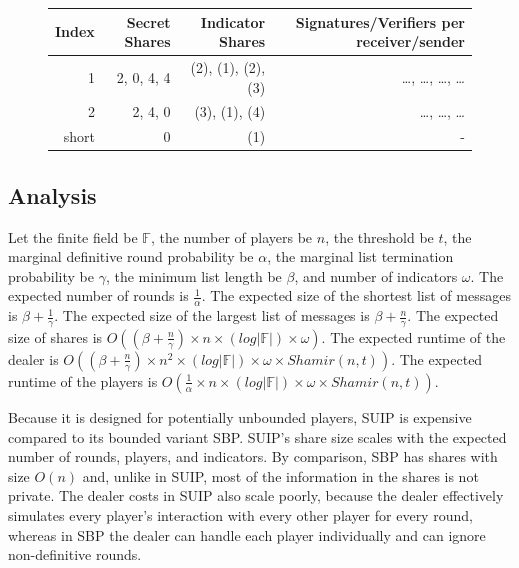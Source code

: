 \documentclass{dalcsthesis}
\begin{document}
\begin{figure}
\begin{itemize}
      \begin{tabular}{|r|r|r|r|}
      \hline
        Index & Secret Shares & Indicator Shares & Signatures/Verifiers per receiver/sender \\
      \hline
        1 & 2, 0, 4, 4 & (2), (1), (2), (3) & \ldots, \ldots, \ldots, \ldots\\
      \hline
        2 & 2, 4, 0 & (3), (1), (4) & \ldots, \ldots, \ldots\\
      \hline
        short & 0 & (1) & -\\
      \hline
      \end{tabular}
  \end{itemize}
\end{figure}

\subsection{Analysis}

Let the finite field be $\mathbb{F}$, the number of players be $n$, the threshold be $t$, the marginal definitive round probability be $\alpha$, the marginal list termination probability be $\gamma$, the minimum list length be $\beta$, and number of indicators $\omega$. The expected number of rounds is $\frac{1}{\alpha}$. The expected size of the shortest list of messages is $\beta + \frac{1}{\gamma}$. The expected size of the largest list of messages is $\beta + \frac{n}{\gamma}$. The expected size of shares is $O((\beta + \frac{n}{\gamma}) \times n \times (log |\mathbb{F}|) \times \omega)$. The expected runtime of the dealer is $O((\beta + \frac{n}{\gamma}) \times n^2 \times (log |\mathbb{F}|) \times \omega \times Shamir(n, t))$. The expected runtime of the players is $O(\frac{1}{\alpha} \times n \times (log |\mathbb{F}|) \times \omega \times Shamir(n, t))$.

Because it is designed for potentially unbounded players, SUIP is expensive compared to its bounded variant SBP. SUIP's share size scales with the expected number of rounds, players, and indicators. By comparison, SBP has shares with size $O(n)$ and, unlike in SUIP, most of the information in the shares is not private. The dealer costs in SUIP also scale poorly, because the dealer effectively simulates every player's interaction with every other player for every round, whereas in SBP the dealer can handle each player individually and can ignore non-definitive rounds.
\end{document}
